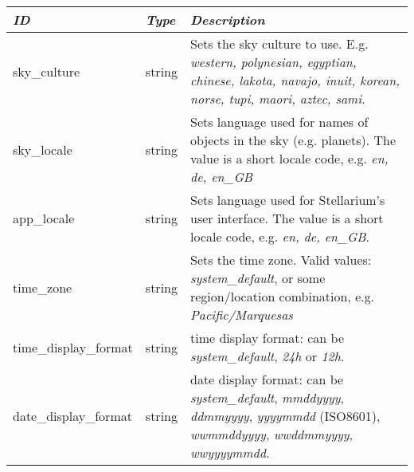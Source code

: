 \subsection{}

\begin{tabularx}{\textwidth}{l|l|X}\toprule
\emph{ID}         & \emph{Type} & \emph{Description}\\\midrule
sky\_culture          & string & Sets the sky culture to use. E.g. \emph{western, polynesian, egyptian, chinese, 
                                 lakota, navajo, inuit, korean, norse, tupi, maori, aztec, sami}.\\%
sky\_locale           & string & Sets language used for names of objects in the sky (e.g. planets). 
                                 The value is a short locale code, e.g. \emph{en, de, en\_GB}\\%
app\_locale           & string & Sets language used for Stellarium's user interface. 
                                  The value is a short locale code, e.g. \emph{en, de, en\_GB}.\\%
time\_zone            & string & Sets the time zone. Valid values: \emph{system\_default}, 
                                 or some region/location combination, e.g. \emph{Pacific/Marquesas}\\%
time\_display\_format & string & time display format: can be \emph{system\_default}, \emph{24h} or \emph{12h}.\\%
date\_display\_format & string & date display format: can be \emph{system\_default}, \emph{mmddyyyy}, \emph{ddmmyyyy}, \emph{yyyymmdd} (ISO8601), \emph{wwmmddyyyy}, \emph{wwddmmyyyy}, \emph{wwyyyymmdd}.\\\bottomrule
\end{tabularx}

\subsection{}


